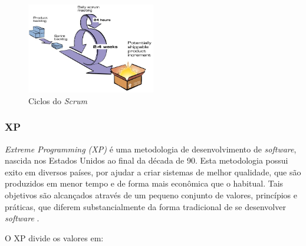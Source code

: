 \documentclass{acm_proc_article-sp}
\begin{document}
\begin{figure}[h]
\centering %
\includegraphics[width=0.5\textwidth]{scrumCiclo.JPG} %
\caption{Ciclos do \textit{Scrum} \cite{scrum:agil}}
\end{figure}


\subsubsection{XP}
\textit{Extreme Programming (XP)} é uma metodologia de desenvolvimento de \textit{software}, nascida nos Estados Unidos ao final da década de 90. Esta metodologia possui exito em diversos países, por ajudar a criar sistemas de melhor qualidade, que são produzidos em menor tempo e de forma mais econômica que o habitual. Tais objetivos são alcançados através de um pequeno conjunto de valores, princípios e práticas, que diferem substancialmente da forma tradicional de se desenvolver \textit{software} \cite{xp:agil}.

O XP divide os valores em:
\end{document}
